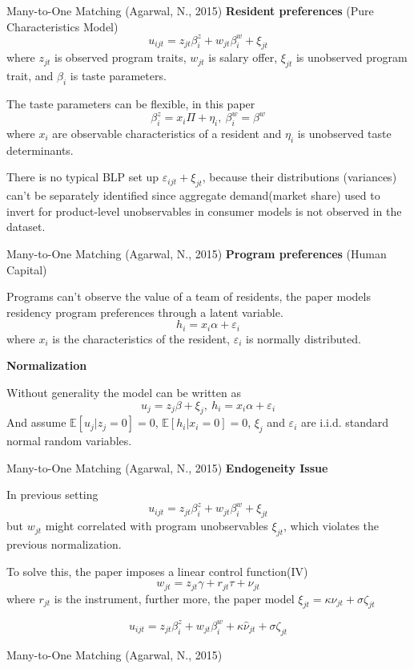 \documentclass[10pt]{beamer}
\begin{document}
\begin{frame}{Many-to-One Matching (Agarwal, N., 2015)}
\textbf{Resident preferences} (Pure Characteristics Model)
$$u_{ijt} = z_{jt} \beta^z_i + w_{jt} \beta^w_i + \xi_{jt}$$
where $z_{jt}$ is observed program traits, $w_{jt}$ is salary offer, $\xi_{jt}$ is unobserved program trait, and $\beta_i$ is taste parameters. 

The taste parameters can be flexible, in this paper
$$\beta^z_i = x_i \Pi + \eta_i,\ \beta^w_i = \beta^w $$
where $x_i$ are observable characteristics of a resident and $\eta_i$ is unobserved taste determinants.

There is no typical BLP set up $\varepsilon_{ijt}+\xi_{jt}$, because their distributions (variances) can't be separately identified since aggregate demand(market share) used to invert for product-level unobservables in consumer models is not observed in the dataset.
\end{frame}

\begin{frame}{Many-to-One Matching (Agarwal, N., 2015)}
\textbf{Program preferences} (Human Capital)

Programs can't observe the value of a team of residents, the paper models residency program preferences through a latent variable.
$$h_i = x_i \alpha + \varepsilon_i $$
where $x_i$ is the characteristics of the resident, $\varepsilon_i$ is normally distributed.
\bigskip

\textbf{Normalization}

Without generality the model can be written as 
$$u_j = z_j \beta + \xi_j,\ h_i = x_i \alpha + \varepsilon_i$$
And assume $\mathbb{E}[u_j | z_j = 0] = 0$, $\mathbb{E}[h_i | x_i = 0] = 0$, $\xi_j$ and $\varepsilon_i$ are i.i.d. standard normal random variables.
\end{frame}


\begin{frame}{Many-to-One Matching (Agarwal, N., 2015)}
\textbf{Endogeneity Issue}

In previous setting 
$$u_{ijt} = z_{jt} \beta^z_i + w_{jt} \beta^w_i + \xi_{jt}$$
but $w_{jt}$ might correlated with program unobservables $\xi_{jt}$, which violates the previous normalization.

To solve this, the paper imposes a linear control function(IV)
$$w_{jt} = z_{jt} \gamma + r_{jt} \tau + \nu_{jt}$$
where $r_{jt}$ is the instrument, further more, the paper model $\xi_{jt}= \kappa\nu_{jt}+\sigma \zeta_{jt}$

$$u_{ijt}=z_{jt} \beta^z_i+w_{jt} \beta^w_i + \kappa\hat\nu_{jt}+\sigma \zeta_{jt}$$
\end{frame}

\begin{frame}{Many-to-One Matching (Agarwal, N., 2015)}


\end{frame}
\end{document}
